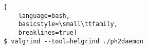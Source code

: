 \ApplyOnePageAppendixPageStyle{}

\begin{lstlisting}[
	language=bash,
	basicstyle=\small\ttfamily,
	breaklines=true]
$ valgrind --tool=helgrind ./ph2daemon
\end{lstlisting}

\ApplyAppendixFirstPageStyle{}

\newpage
\ApplyAppendixLastPageStyle{}
